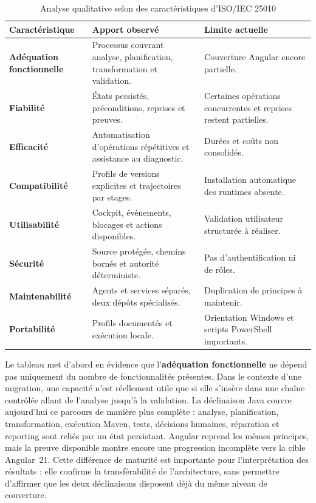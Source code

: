 \begin{table}[H]
    \centering
    \caption{Analyse qualitative selon des caractéristiques d'ISO/IEC 25010}
    \label{tab:qualite-iso25010-ch5}
    \small
    \begin{tabularx}{\textwidth}{|>{\bfseries\RaggedRight\arraybackslash}p{3.2cm}|>{\RaggedRight\arraybackslash}p{5.4cm}|>{\RaggedRight\arraybackslash}X|}
        \hline
        \rowcolor{cgilight!95}
        \textbf{Caractéristique} & \textbf{Apport observé} & \textbf{Limite actuelle} \\
        \hline
        Adéquation fonctionnelle & Processus couvrant analyse, planification, transformation et validation. & Couverture Angular encore partielle. \\
        \hline
        Fiabilité & États persistés, préconditions, reprises et preuves. & Certaines opérations concurrentes et reprises restent partielles. \\
        \hline
        Efficacité & Automatisation d'opérations répétitives et assistance au diagnostic. & Durées et coûts non consolidés. \\
        \hline
        Compatibilité & Profils de versions explicites et trajectoires par stages. & Installation automatique des runtimes absente. \\
        \hline
        Utilisabilité & Cockpit, événements, blocages et actions disponibles. & Validation utilisateur structurée à réaliser. \\
        \hline
        Sécurité & Source protégée, chemins bornés et autorité déterministe. & Pas d'authentification ni de rôles. \\
        \hline
        Maintenabilité & Agents et services séparés, deux dépôts spécialisés. & Duplication de principes à maintenir. \\
        \hline
        Portabilité & Profils documentés et exécution locale. & Orientation Windows et scripts PowerShell importants. \\
        \hline
    \end{tabularx}
\end{table}

Le tableau met d'abord en évidence que l'\textbf{adéquation fonctionnelle} ne dépend pas uniquement du nombre de fonctionnalités présentes. Dans le contexte d'une migration, une capacité n'est réellement utile que si elle s'insère dans une chaîne contrôlée allant de l'analyse jusqu'à la validation. La déclinaison Java couvre aujourd'hui ce parcours de manière plus complète : analyse, planification, transformation, exécution Maven, tests, décisions humaines, réparation et reporting sont reliés par un état persistant. Angular reprend les mêmes principes, mais la preuve disponible montre encore une progression incomplète vers la cible Angular~21. Cette différence de maturité est importante pour l'interprétation des résultats : elle confirme la transférabilité de l'architecture, sans permettre d'affirmer que les deux déclinaisons disposent déjà du même niveau de couverture.

